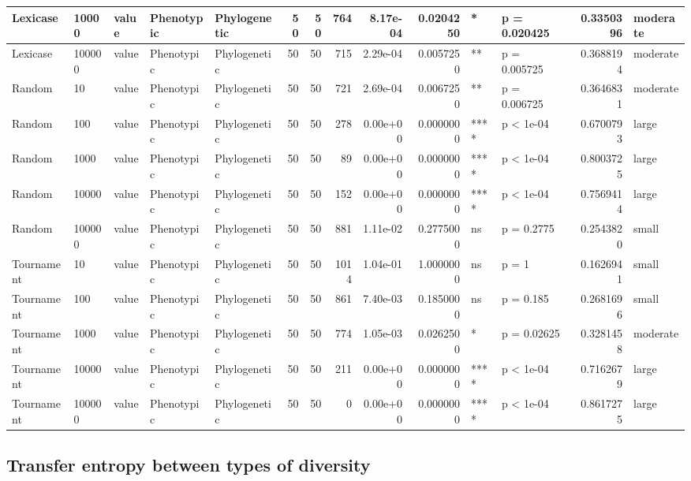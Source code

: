 \documentclass[]{book}
\begin{document}
\begin{table}
\begin{tabular}[t]{l|l|l|l|l|r|r|r|r|r|l|l|r|l}
\hline
Lexicase & 10000 & value & Phenotypic & Phylogenetic & 50 & 50 & 764 & 8.17e-04 & 0.0204250 & * & p = 0.020425 & 0.3350396 & moderate\\
\hline
Lexicase & 100000 & value & Phenotypic & Phylogenetic & 50 & 50 & 715 & 2.29e-04 & 0.0057250 & ** & p = 0.005725 & 0.3688194 & moderate\\
\hline
Random & 10 & value & Phenotypic & Phylogenetic & 50 & 50 & 721 & 2.69e-04 & 0.0067250 & ** & p = 0.006725 & 0.3646831 & moderate\\
\hline
Random & 100 & value & Phenotypic & Phylogenetic & 50 & 50 & 278 & 0.00e+00 & 0.0000000 & **** & p < 1e-04 & 0.6700793 & large\\
\hline
Random & 1000 & value & Phenotypic & Phylogenetic & 50 & 50 & 89 & 0.00e+00 & 0.0000000 & **** & p < 1e-04 & 0.8003725 & large\\
\hline
Random & 10000 & value & Phenotypic & Phylogenetic & 50 & 50 & 152 & 0.00e+00 & 0.0000000 & **** & p < 1e-04 & 0.7569414 & large\\
\hline
Random & 100000 & value & Phenotypic & Phylogenetic & 50 & 50 & 881 & 1.11e-02 & 0.2775000 & ns & p = 0.2775 & 0.2543820 & small\\
\hline
Tournament & 10 & value & Phenotypic & Phylogenetic & 50 & 50 & 1014 & 1.04e-01 & 1.0000000 & ns & p = 1 & 0.1626941 & small\\
\hline
Tournament & 100 & value & Phenotypic & Phylogenetic & 50 & 50 & 861 & 7.40e-03 & 0.1850000 & ns & p = 0.185 & 0.2681696 & small\\
\hline
Tournament & 1000 & value & Phenotypic & Phylogenetic & 50 & 50 & 774 & 1.05e-03 & 0.0262500 & * & p = 0.02625 & 0.3281458 & moderate\\
\hline
Tournament & 10000 & value & Phenotypic & Phylogenetic & 50 & 50 & 211 & 0.00e+00 & 0.0000000 & **** & p < 1e-04 & 0.7162679 & large\\
\hline
Tournament & 100000 & value & Phenotypic & Phylogenetic & 50 & 50 & 0 & 0.00e+00 & 0.0000000 & **** & p < 1e-04 & 0.8617275 & large\\
\hline
\end{tabular}
\end{table}

\hypertarget{transfer-entropy-between-types-of-diversity}{%
\subsection{Transfer entropy between types of diversity}\label{transfer-entropy-between-types-of-diversity}}
\end{document}
